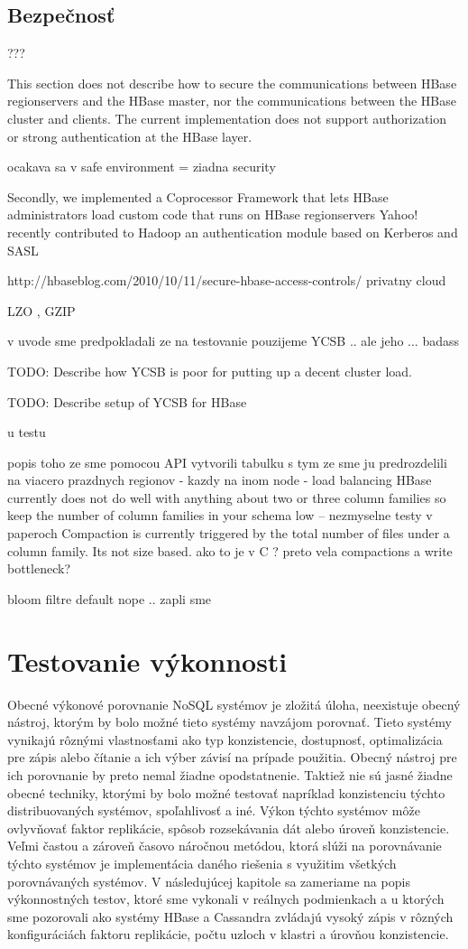 \documentclass[11pt,twoside,a4paper]{book}
\begin{document}
\section{Bezpečnosť}

???

This section does
not describe how to secure the communications between HBase regionservers and
the HBase master, nor the communications between the HBase cluster and clients.
The current implementation does not support authorization or strong
authentication at the HBase layer.

ocakava sa v safe environment = ziadna security

Secondly, we implemented a Coprocessor Framework that lets HBase administrators load custom code that runs on HBase regionservers
Yahoo! recently contributed to Hadoop an authentication module based on Kerberos and SASL

http://hbaseblog.com/2010/10/11/secure-hbase-access-controls/
privatny cloud 


LZO , GZIP

v uvode sme predpokladali ze na testovanie pouzijeme YCSB .. ale jeho ... badass


TODO: Describe how YCSB is poor for putting up a decent cluster load.

TODO: Describe setup of YCSB for HBase


u testu 

popis toho ze sme pomocou API vytvorili tabulku s tym ze sme ju predrozdelili na viacero prazdnych regionov - kazdy na inom node - load balancing 
HBase currently does not do well with anything about two or three column families so keep the number of column families in your schema low -- nezmyselne testy v paperoch
Compaction is currently triggered by the total number of files under a column family. Its not size based. ako to je v C ? preto vela compactions a write bottleneck?

bloom filtre default nope .. zapli sme 
\chapter{Testovanie výkonnosti}

Obecné výkonové porovnanie NoSQL systémov je zložitá úloha, neexistuje obecný nástroj, ktorým by bolo možné tieto systémy navzájom porovnať. 
Tieto systémy vynikajú rôznými vlastnosťami ako typ konzistencie, dostupnosť, optimalizácia pre zápis alebo čítanie a ich výber závisí na prípade použitia. Obecný nástroj pre ich porovnanie by preto nemal žiadne opodstatnenie. Taktiež nie sú jasné žiadne obecné techniky, ktorými by bolo možné testovať napríklad konzistenciu týchto distribuovaných systémov, spoľahlivosť a iné. Výkon týchto systémov môže ovlyvňovať faktor replikácie, spôsob rozsekávania dát alebo úroveň konzistencie. Veľmi častou a zároveň časovo náročnou metódou, ktorá slúži na porovnávanie týchto systémov je implementácia daného riešenia s využitim všetkých porovnávaných systémov. V následujúcej kapitole sa zameriame na popis výkonnostných testov, ktoré sme vykonali v reálnych podmienkach a u ktorých sme pozorovali ako systémy HBase a Cassandra zvládajú vysoký zápis v rôzných konfiguráciách faktoru replikácie, počtu uzloch v klastri a úrovňou konzistencie.
\end{document}
